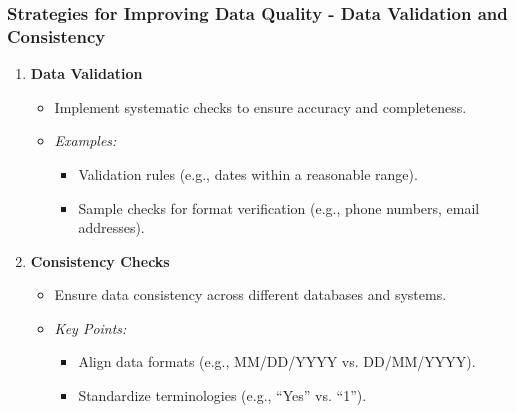 \documentclass[aspectratio=169]{beamer}
\begin{document}
\begin{frame}[fragile]
    \frametitle{Strategies for Improving Data Quality - Data Validation and Consistency}
    \begin{enumerate}
        \item \textbf{Data Validation}
        \begin{itemize}
            \item Implement systematic checks to ensure accuracy and completeness.
            \item \textit{Examples:}
            \begin{itemize}
                \item Validation rules (e.g., dates within a reasonable range).
                \item Sample checks for format verification (e.g., phone numbers, email addresses).
            \end{itemize}
        \end{itemize}
        
        \item \textbf{Consistency Checks}
        \begin{itemize}
            \item Ensure data consistency across different databases and systems.
            \item \textit{Key Points:}
            \begin{itemize}
                \item Align data formats (e.g., MM/DD/YYYY vs. DD/MM/YYYY).
                \item Standardize terminologies (e.g., “Yes” vs. “1”).
            \end{itemize}
        \end{itemize}
    \end{enumerate}
\end{frame}
\end{document}
